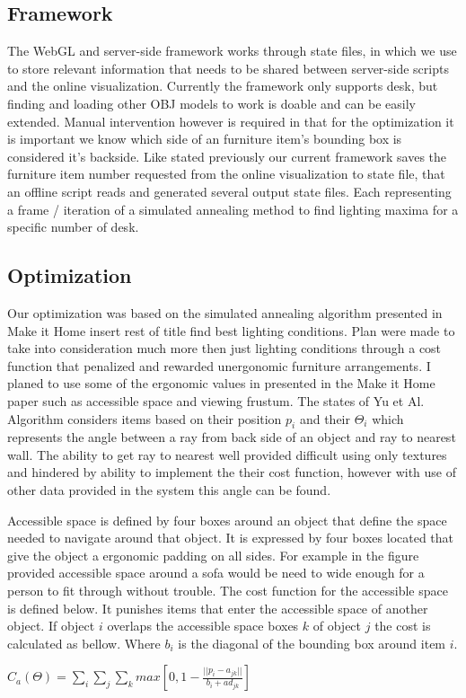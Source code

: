 \documentclass[twoside]{article}
\begin{document}
\begin{multicols}{2}
\subsection{Framework}
The WebGL and server-side framework works through state files, in which we use to store relevant information that needs to be
shared between server-side scripts and the online visualization. Currently the framework only supports desk, but finding and
loading other OBJ models to work is doable and can be easily extended. Manual intervention however is required in that for
the optimization it is important we know which side of an furniture item's  bounding box is considered it's backside. Like stated
previously our current framework saves the furniture item number requested from the online visualization to state file, that an
offline script reads and generated several output state files. Each representing a frame / iteration of a simulated annealing
method to find lighting maxima for a specific number of desk. 

\subsection{Optimization}
Our optimization was based on the simulated annealing algorithm presented in Make it Home insert rest of title
find best lighting conditions. Plan were made to take into consideration much more then just lighting conditions
through a cost function that penalized and rewarded unergonomic furniture arrangements. I planed to use some of
the ergonomic values in presented in the Make it Home paper such as accessible space and viewing frustum. 
The states of Yu et Al. Algorithm considers items based on their position $p_i$ and
their $\Theta_i$ which represents the angle between a ray from back side of an object and ray to nearest wall.
The ability to get ray to nearest well provided difficult using only textures and hindered by ability to implement
the their cost function, however with use of other data provided in the system this angle can be found.


Accessible space is defined by four boxes around an object that define the space needed to navigate around that object.
It is expressed by four boxes located that give the object a ergonomic padding on all sides.
For example in the figure provided accessible space around a sofa would be need to wide enough for a person to fit through
without trouble. The cost function for the accessible space is defined below. It punishes items that enter the accessible space
of another object. If object $i$ overlaps the accessible space boxes $k$ of object $j$ the cost is calculated as bellow.
Where $b_i$ is the diagonal of the bounding box around item $i$.
\begin{center}
$C_a (\Theta) = \sum_{i}\sum_{j}\sum_{k} max\left[ 0,1 - \frac{||p_i - a _{jk}||}{b_i + ad_{jk}} \right]$
\end{center}



\end{multicols}
\end{document}
